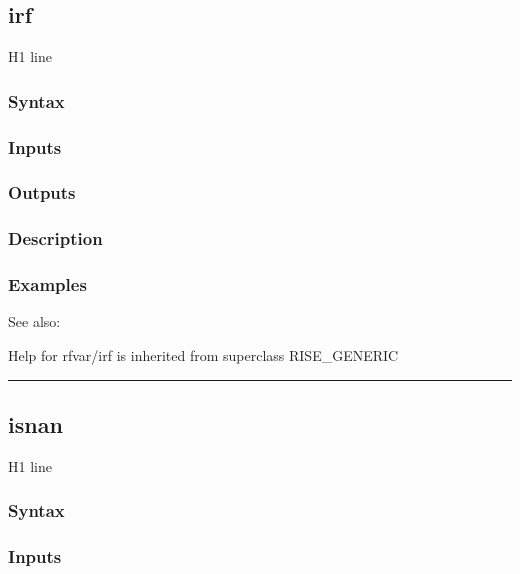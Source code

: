 \documentclass[letterpaper,10pt,english]{sphinxmanual}
\begin{document}
\subsection{irf}
\label{classes/models/@rfvar/rfvar:id38}\label{classes/models/@rfvar/rfvar:irf}
H1 line


\subsubsection{Syntax}
\label{classes/models/@rfvar/rfvar:id39}

\subsubsection{Inputs}
\label{classes/models/@rfvar/rfvar:id40}

\subsubsection{Outputs}
\label{classes/models/@rfvar/rfvar:id41}

\subsubsection{Description}
\label{classes/models/@rfvar/rfvar:id42}

\subsubsection{Examples}
\label{classes/models/@rfvar/rfvar:id43}
See also:

Help for rfvar/irf is inherited from superclass RISE\_GENERIC


\bigskip\hrule{}\bigskip



\subsection{isnan}
\label{classes/models/@rfvar/rfvar:isnan}\label{classes/models/@rfvar/rfvar:id44}
H1 line


\subsubsection{Syntax}
\label{classes/models/@rfvar/rfvar:id45}

\subsubsection{Inputs}
\label{classes/models/@rfvar/rfvar:id46}
\end{document}
